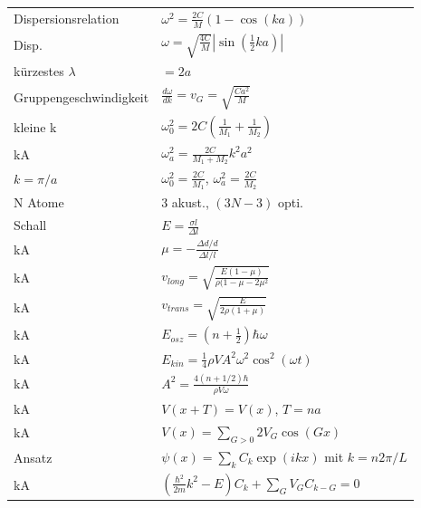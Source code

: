 \documentclass[12pt,a4paper]{article}
\renewcommand{\d}[2]{\frac{d #1}{d #2}}
\renewcommand{\=}[1]{\stackrel{#1}{=}}
\theoremstyle{definition}
\theoremstyle{remark}
\begin{document}
\begin{center}
\begin{minipage}[t]{.35\linewidth}
\vspace{0pt}
\noindent\begin{tabular}{ll}
\toprule
Dispersionsrelation & $\omega^2 = \frac{2C}{M} (1-\cos(ka))$\\
Disp. & $\omega = \sqrt{\frac{4C}{M}} |\sin(\frac{1}{2} ka)|$\\
kürzestes $\lambda$ &  $= 2a$\\
Gruppengeschwindigkeit & $\d{\omega}{k} = v_G = \sqrt{\frac{Ca^2}{M}}$\\
kleine k & $\omega_0^2 = 2C (\frac{1}{M_1} + \frac{1}{M_2})$\\
kA & $\omega_a^2 = \frac{2C}{M_1 + M_2}k^2 a^2$\\
$k = \pi/a$ &  $\omega_0^2 = \frac{2C}{M_1}$, $\omega_a^2 = \frac{2C}{M_2}$\\
N Atome & 3 akust., $(3N-3)$ opti.\\
Schall & $E = \frac{\sigma l}{\Delta l}$\\
kA & $\mu = - \frac{\Delta d / d}{\Delta l / l}$\\
kA & $v_{long} = \sqrt{\frac{E(1-\mu)}{\rho(1-\mu-2\mu^2}}$\\
kA & $v_{trans} = \sqrt{\frac{E}{2\rho (1 + \mu)}}$\\
kA & $E_{osz} = (n+\frac{1}{2}) \hbar \omega$\\
kA & $E_{kin} = \frac{1}{4} \rho V A^2 \omega^2 \cos^2 (\omega t)$\\
kA & $A^2 = \frac{4(n+1/2)\hbar}{\rho V\omega}$\\
kA & $V(x+T) = V(x)$, $T=na$\\
kA & $V(x) = \sum_{G>0} 2 V_G \cos(Gx)$\\
Ansatz & $\psi(x) = \sum_k C_k \exp(ikx)$ mit $k = n 2\pi/L$\\
kA & $(\frac{\hbar^2}{2m} k^2 - E) C_k + \sum_G V_G C_{k-G} = 0$\\
\bottomrule
\end{tabular}
\end{minipage}%
\begin{minipage}[t]{.65\linewidth}
\vspace{0pt}
\begin{tabular}{ll}
\toprule

\end{tabular}
\end{minipage}
\end{center}
\end{document}
